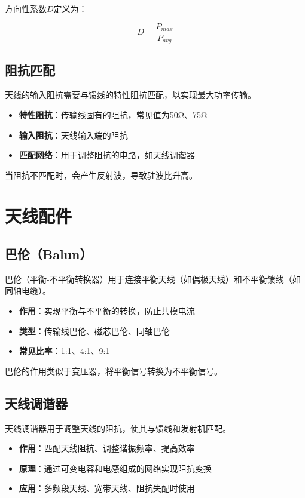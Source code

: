 方向性系数$D$定义为：

\[ D = \frac{P_{max}}{P_{avg}} \]

\subsection{阻抗匹配}
\label{sec:impedance_matching}

天线的输入阻抗需要与馈线的特性阻抗匹配，以实现最大功率传输。

\begin{itemize}
    \item \textbf{特性阻抗}：传输线固有的阻抗，常见值为50Ω、75Ω
    \item \textbf{输入阻抗}：天线输入端的阻抗
    \item \textbf{匹配网络}：用于调整阻抗的电路，如天线调谐器
\end{itemize}

当阻抗不匹配时，会产生反射波，导致驻波比升高。

\section{天线配件}
\label{sec:antenna_accessories}

\subsection{巴伦（Balun）}
\label{sec:balun}

巴伦（平衡-不平衡转换器）用于连接平衡天线（如偶极天线）和不平衡馈线（如同轴电缆）。

\begin{itemize}
    \item \textbf{作用}：实现平衡与不平衡的转换，防止共模电流
    \item \textbf{类型}：传输线巴伦、磁芯巴伦、同轴巴伦
    \item \textbf{常见比率}：1:1、4:1、9:1
\end{itemize}

巴伦的作用类似于变压器，将平衡信号转换为不平衡信号。

\subsection{天线调谐器}
\label{sec:antenna_tuner}

天线调谐器用于调整天线的阻抗，使其与馈线和发射机匹配。

\begin{itemize}
    \item \textbf{作用}：匹配天线阻抗、调整谐振频率、提高效率
    \item \textbf{原理}：通过可变电容和电感组成的网络实现阻抗变换
    \item \textbf{应用}：多频段天线、宽带天线、阻抗失配时使用
\end{itemize}

